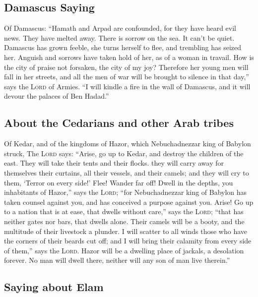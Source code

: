 \hypertarget{damascus-saying}{%
\subsection{Damascus Saying}\label{damascus-saying}}

 Of Damascus: ``Hamath and Arpad are confounded, for they
have heard evil news. They have melted away. There is sorrow on the sea.
It can't be quiet.  Damascus has grown feeble, she turns
herself to flee, and trembling has seized her. Anguish and sorrows have
taken hold of her, as of a woman in travail.  How is the
city of praise not forsaken, the city of my joy? 
Therefore her young men will fall in her streets, and all the men of war
will be brought to silence in that day,'' says the \textsc{Lord} of
Armies.  ``I will kindle a fire in the wall of Damascus,
and it will devour the palaces of Ben Hadad.''

\hypertarget{about-the-cedarians-and-other-arab-tribes}{%
\subsection{About the Cedarians and other Arab
tribes}\label{about-the-cedarians-and-other-arab-tribes}}

 Of Kedar, and of the kingdoms of Hazor, which
Nebuchadnezzar king of Babylon struck, The \textsc{Lord} says: ``Arise,
go up to Kedar, and destroy the children of the east. 
They will take their tents and their flocks. they will carry away for
themselves their curtains, all their vessels, and their camels; and they
will cry to them, `Terror on every side!'  Flee! Wander
far off! Dwell in the depths, you inhabitants of Hazor,'' says the
\textsc{Lord}; ``for Nebuchadnezzar king of Babylon has taken counsel
against you, and has conceived a purpose against you. 
Arise! Go up to a nation that is at ease, that dwells without care,''
says the \textsc{Lord}; ``that has neither gates nor bars, that dwells
alone.  Their camels will be a booty, and the multitude
of their livestock a plunder. I will scatter to all winds those who have
the corners of their beards cut off; and I will bring their calamity
from every side of them,'' says the \textsc{Lord}.  Hazor
will be a dwelling place of jackals, a desolation forever. No man will
dwell there, neither will any son of man live therein.''

\hypertarget{saying-about-elam}{%
\subsection{Saying about Elam}\label{saying-about-elam}}


